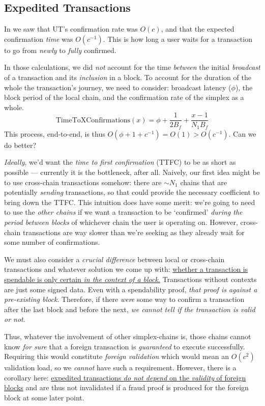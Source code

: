 \subsection{Expedited Transactions}

\label{sec:expedited-txs}

In  we saw that UT's confirmation rate was $O(c)$, and that the expected confirmation \emph{time} was $O(c^{-1})$.
This is how long a user waits for a transaction to go from \emph{newly} to \emph{fully} {confirmed}.

In those calculations, we did \emph{not} account for the time \emph{between} the initial \emph{broadcast} of a transaction and its \emph{inclusion} in a block.
To account for the duration of the whole the transaction's journey, we need to consider: broadcast latency ($\phi$), the block period of the local chain, and the confirmation rate of the simplex as a whole.
$$ \text{TimeToXConfirmations}(x) = \phi + \frac{1}{2 B_f} + \frac{x-1}{N_1 B_f} $$
This process, end-to-end, is thus $O(\phi + 1 + c^{-1}) = O(1) > O(c^{-1})$.
Can we do better?

\emph{Ideally}, we'd want the \emph{time to first confirmation} (TTFC) to be as short as possible --- currently it is the bottleneck, after all.
Naively, our first idea might be to use cross-chain transactions somehow: there are $\sim N_1$ chains that are potentially \emph{sending} transactions, so that could provide the necessary coefficient to bring down the TTFC.
This intuition does have some merit: we're going to need to use the \emph{other chains} if we want a transaction to be `confirmed' \emph{during the period between blocks} of whichever chain the user is operating on.
However, cross-chain transactions are way slower than we're seeking as they already wait for some number of confirmations.

We must also consider a \emph{crucial difference} between local or cross-chain transactions and whatever solution we come up with:
\ul{whether a transaction is spendable is only certain \emph{in the context of a block}.}
Transactions without contexts are just some signed data.
Even with a spendability proof, \emph{that proof is against a pre-existing block}.
Therefore, if there \emph{were} some way to confirm a transaction after the last block and before the next, \emph{we cannot tell if the transaction is valid or not}.

Thus, whatever the involvement of other simplex-chains is, those chains cannot know \emph{for sure} that a foreign transaction is \emph{guaranteed} to execute successfully.
Requiring this would constitute \emph{foreign validation} which would mean an $O(c^2)$ validation load, so we \emph{cannot} have such a requirement.
However, there is a corollary here: \ul{expedited transactions \emph{do not depend} on the \emph{validity} of foreign blocks} and are thus not invalidated if a fraud proof is produced for the foreign block at some later point.

